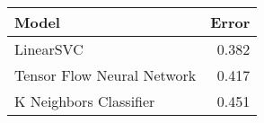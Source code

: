 \begin{tabular}{lr}
\toprule
                     Model &  Error \\
\midrule
                 LinearSVC &  0.382 \\
Tensor Flow Neural Network &  0.417 \\
    K Neighbors Classifier &  0.451 \\
\bottomrule
\end{tabular}
